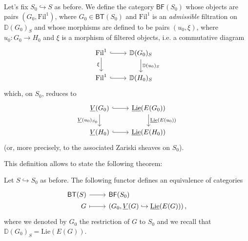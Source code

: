 \begin{defn}[]
	Let's fix $S_0 \hookrightarrow S$ as before.
	We define the category $\mathsf{BF}(S_0)$ whose objects
	are pairs $(G_0, \mathrm{Fil}^1)$, where $G_0 \in \mathsf{BT}(S_0)$
	and $\mathrm{Fil}^1$ is an {\em admissible} filtration on
	$\mathbb{D}(G_0)_S$ and whose morphisms are defined to be
	pairs $(u_0, \xi)$, where $u_0\colon G_0 \to H_0$
	and $\xi$ is a morphism of filtered objects, i.e. a commutative diagram
	\begin{equation*}
	\begin{tikzcd}
		\mathrm{Fil}^1 \arrow[d, "\xi"', rightarrow] 
		\arrow[r, "", hookrightarrow] &
		\mathbb{D}(G_0)_S 
		\arrow[d, "\mathbb{D}(u_0)_S", rightarrow] \\
		\mathrm{Fil}^1 \arrow[r, "", hookrightarrow] &
		\mathbb{D}(H_0)_S
	\end{tikzcd}
	\end{equation*}
	which, on $S_0$, reduces to
	\begin{equation*}
	\begin{tikzcd}
		\underline{V}(G_0) \arrow[r, "", hookrightarrow] 
		\arrow[d, "\underline{V}(u_0)_{S_0}"', rightarrow] &
		\underline{\mathrm{Lie}}(E(G_0))
		\arrow[d, "\underline{\mathrm{Lie}}(E(u_0))", rightarrow] \\
		\underline{V}(H_0) \arrow[r, "", hookrightarrow] &
		\underline{\mathrm{Lie}}(E(H_0))
	\end{tikzcd}
	\end{equation*}
	(or, more precisely, to the associated Zariski sheaves on $S_0$).
\end{defn}


\noindent
This definition allows to state the following theorem:
\begin{thm}\label{thm:EquivCatBTS}
	Let $S \hookrightarrow S_0$ as before.
	The following functor defines an equivalence of categories
	\begin{equation*}
	\begin{tikzcd}[row sep = 0ex
		,/tikz/column 1/.append style={anchor=base east}
		,/tikz/column 2/.append style={anchor=base west}]
		\mathsf{BT}(S) \arrow[r, "", rightarrow] &
		\mathsf{BF}(S_0) \\
		G \arrow[r, "", mapsto] & 
		\left(G_0, \underline{V}(G) \hookrightarrow \underline{\mathrm{Lie}}(E(G))\right)
	,\end{tikzcd}
	\end{equation*} 
	where we denoted by $G_0$ the restriction of $G$ to $S_0$
	and we recall that $\mathbb{D}(G_0)_S = \mathrm{Lie}(E(G))$.
\end{thm}


